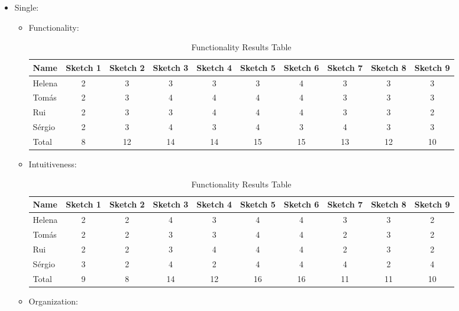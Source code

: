 \begin{itemize}
    \item Single:
    \begin{itemize}
        \item Functionality:
        \begin{table}[H]
            \caption{Functionality Results Table}
            \begin{tabular}{l*{9}{c}}
            Name & Sketch 1 & Sketch 2 & Sketch 3 & Sketch 4 
            & Sketch 5 & Sketch 6 & Sketch 7 & Sketch 8 & Sketch 9 \\
            \hline 
            Helena & 2 & 3 & 3 & 3 & 3 & 4 & 3 & 3 & 3 \\
            Tomás & 2 & 3 & 4 & 4 & 4 & 4 & 3 & 3 & 3 \\ 
            Rui & 2 & 3 & 3 & 4 & 4 & 4 & 3 & 3 & 2 \\ 
            Sérgio & 2 & 3 & 4 & 3 & 4 & 3 & 4 & 3 & 3 \\ 
            \hline
            Total & 8 & 12 & 14 & 14 & 15 & 15 & 13 & 12 & 10 \\
            \end{tabular}
            \end{table}
            \item Intuitiveness: 
            \begin{table}[H]
                \caption{Functionality Results Table}
                \begin{tabular}{l*{9}{c}}
                Name & Sketch 1 & Sketch 2 & Sketch 3 & Sketch 4 
                & Sketch 5 & Sketch 6 & Sketch 7 & Sketch 8 & Sketch 9 \\
                \hline 
                Helena & 2 & 2 & 4 & 3 & 4 & 4 & 3 & 3 & 2 \\
                Tomás & 2 & 2 & 3 & 3 & 4 & 4 & 2 & 3 & 2 \\ 
                Rui & 2 & 2 & 3 & 4 & 4 & 4 & 2 & 3 & 2 \\ 
                Sérgio & 3 & 2 & 4 & 2 & 4 & 4 & 4 & 2 & 4 \\ 
                \hline
                Total & 9 & 8 & 14 & 12 & 16 & 16 & 11 & 11 & 10 \\
                \end{tabular}
            \end{table}
            \item Organization: 
            \begin{table}[H]

\end{table}
\end{itemize}
\end{itemize}
